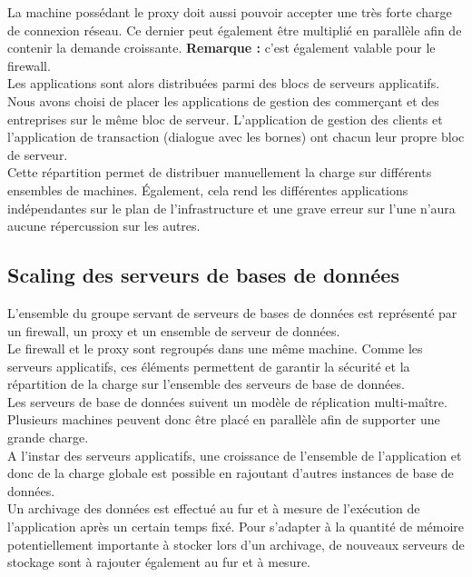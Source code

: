 La machine possédant le proxy doit aussi pouvoir accepter une très forte charge
de connexion réseau. Ce dernier peut également être multiplié en parallèle afin
de contenir la demande croissante. \textbf{Remarque :} c'est également valable
pour le firewall. \\

Les applications sont alors distribuées parmi des blocs de serveurs
applicatifs. Nous avons choisi de placer les applications de gestion des
commerçant et des entreprises sur le même bloc de serveur. L'application de
gestion des clients et l'application de transaction (dialogue avec les bornes)
ont chacun leur propre bloc de serveur. \\

Cette répartition permet de distribuer manuellement la charge sur différents
ensembles de machines. Également, cela rend les différentes applications
indépendantes sur le plan de l'infrastructure et une grave erreur sur l'une
n'aura aucune répercussion sur les autres. \\

\subsection{Scaling des serveurs de bases de données}
\label{subsec:scaling-bdd}

L'ensemble du groupe servant de serveurs de bases de données est représenté par
un firewall, un proxy et un ensemble de serveur de données. \\

Le firewall et le proxy sont regroupés dans une même machine. Comme les
serveurs applicatifs, ces éléments permettent de garantir la sécurité et la
répartition de la charge sur l'ensemble des serveurs de base de données. \\

Les serveurs de base de données suivent un modèle de réplication multi-maître.
Plusieurs machines peuvent donc être placé en parallèle afin de supporter une
grande charge. \\

A l'instar des serveurs applicatifs, une croissance de l'ensemble de
l'application et donc de la charge globale est possible en rajoutant d'autres
instances de base de données. \\

Un archivage des données est effectué au fur et à mesure de l'exécution de
l'application après un certain temps fixé. Pour s'adapter à la quantité de
mémoire potentiellement importante à stocker lors d'un archivage, de nouveaux
serveurs de stockage sont à rajouter également au fur et à mesure. \\

